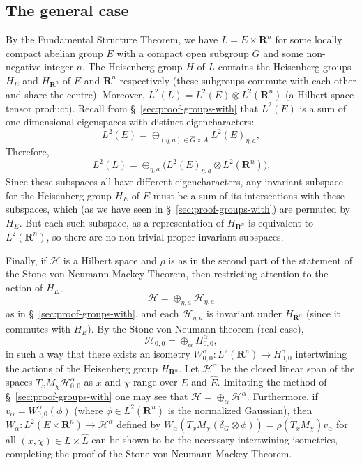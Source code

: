 \documentclass[11pt]{amsart}
\numberwithin{equation}{section}
\theoremstyle{plain}
\theoremstyle{definition}
\newcommand{\Hilb}{\mathcal H}
\newcommand{\R}{\mathbf R}
\begin{document}
\subsection{The general case}
By the Fundamental Structure Theorem, we have $L=E\times \R^n$ for some locally compact abelian group $E$ with a compact open subgroup $G$ and some non-negative integer $n$.
The Heisenberg group $H$ of $L$ contains the Heisenberg groups $H_E$ and $H_{\R^n}$ of $E$ and $\R^n$ respectively (these subgroups commute with each other and share the centre).
Moreover, $L^2(L)=L^2(E)\otimes L^2(\R^n)$ (a Hilbert space tensor product).
Recall from \S~\ref{sec:proof-groups-with} that $L^2(E)$ is a sum of one-dimensional eigenspaces with distinct eigencharacters:
\begin{equation*}
  L^2(E)=\oplus_{(\eta,a)\in \hat G\times A} L^2(E)_{\eta,a},
\end{equation*}
Therefore,
\begin{equation*}
  L^2(L)=\oplus_{\eta,a}\big( L^2(E)_{\eta,a}\otimes L^2(\R^n)\big).
\end{equation*}
Since these subspaces all have different eigencharacters, any invariant subspace for the Heisenberg group $H_E$ of $E$ must be a sum of its intersections with these subspaces, which (as we have seen in \S~\ref{sec:proof-groups-with}) are permuted by $H_E$.
But each such subspace, as a representation of $H_{\R^n}$ is equivalent to $L^2(\R^n)$, so there are no non-trivial proper invariant subspaces.

Finally, if $\Hilb$ is a Hilbert space and $\rho$ is as in the second part of the statement of the Stone-von Neumann-Mackey Theorem, then restricting attention to the action of $H_E$,
\begin{equation*}
  \Hilb = \oplus_{\eta,a} \Hilb_{\eta,a}
\end{equation*}
as in \S~\ref{sec:proof-groups-with}, and each $\Hilb_{\eta,a}$ is invariant under $H_{\R^n}$ (since it commutes with $H_E$).
By the Stone-von Neumann theorem (real case),
\begin{equation*}
  \Hilb_{0,0}=\oplus_\alpha H^\alpha_{0,0},
\end{equation*}
in such a way that there exists an isometry $W^\alpha_{0,0}:L^2(\R^n)\to H^\alpha_{0,0}$ intertwining the actions of the Heisenberg group $H_{\R^n}$.
Let $\Hilb^\alpha$ be the closed linear span of the spaces $T_x M_\chi\Hilb^\alpha_{0,0}$ as $x$ and $\chi$ range over $E$ and $\hat E$.
Imitating the method of \S~\ref{sec:proof-groups-with} one may see that $\Hilb=\oplus_\alpha\Hilb^\alpha$.
Furthermore, if $v_\alpha=W^\alpha_{0,0}(\phi)$ (where $\phi\in L^2(\R^n)$ is the normalized Gaussian), then $W_\alpha:L^2(E\times \R^n)\to \Hilb^\alpha$ defined by $W_\alpha(T_x M_\chi(\delta_G\otimes \phi))=\rho(T_x M_\chi)v_\alpha$ for all $(x,\chi)\in L\times \hat L$ can be shown to be the necessary intertwining isometries, completing the proof of the Stone-von Neumann-Mackey Theorem.
\end{document}
